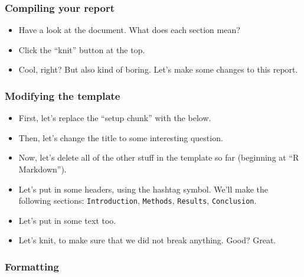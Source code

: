 \documentclass[
]{book}
\providecommand{\tightlist}{%
  \setlength{\itemsep}{0pt}\setlength{\parskip}{0pt}}
\begin{document}
\hypertarget{compiling-your-report}{%
\subsubsection*{Compiling your report}\label{compiling-your-report}}

\begin{itemize}
\tightlist
\item
  Have a look at the document. What does each section mean?\\
\item
  Click the ``knit'' button at the top.\\
\item
  Cool, right? But also kind of boring. Let's make some changes to this report.
\end{itemize}

\hypertarget{modifying-the-template}{%
\subsubsection*{Modifying the template}\label{modifying-the-template}}

\begin{itemize}
\item
  First, let's replace the ``setup chunk'' with the below.
\item
  Then, let's change the title to some interesting question.\\
\item
  Now, let's delete all of the other stuff in the template so far (beginning at ``R Markdown'').\\
\item
  Let's put in some headers, using the hashtag symbol. We'll make the following sections: \texttt{Introduction}, \texttt{Methods}, \texttt{Results}, \texttt{Conclusion}.\\
\item
  Let's put in some text too.\\
\item
  Let's knit, to make sure that we did not break anything. Good? Great.
\end{itemize}

\hypertarget{formatting}{%
\subsubsection*{Formatting}\label{formatting}}
\end{document}
